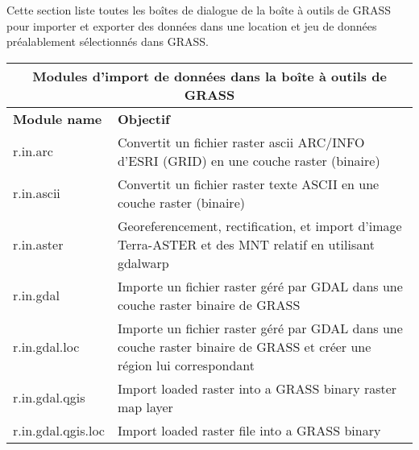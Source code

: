 Cette section liste toutes les boîtes de dialogue de la boîte à outils de GRASS pour importer et exporter des données dans une location et jeu de données préalablement sélectionnés dans GRASS.
\begin{center}
 \begin{tabular}{|p{2.5cm}|p{11.5cm}|}
  \hline \multicolumn{2}{|c|}{\textbf{Modules d'import de données dans la boîte à outils de GRASS}} \\ 
  \hline \textbf{Module name} & \textbf{Objectif} \\
    \hline r.in.arc & Convertit un fichier raster ascii ARC/INFO d'ESRI (GRID) en une couche raster (binaire) \\
 \hline r.in.ascii & Convertit un fichier raster texte ASCII en une couche raster (binaire)\\
  \hline r.in.aster & Georeferencement, rectification, et import d'image Terra-ASTER et des MNT relatif en utilisant gdalwarp \\
    \hline r.in.gdal &  Importe un fichier raster géré par GDAL dans une couche raster binaire de GRASS\\
  \hline r.in.gdal.loc &  Importe un fichier raster géré par GDAL dans une couche raster binaire de GRASS et créer une région lui correspondant\\
  \hline r.in.gdal.qgis & Import loaded raster into a GRASS binary raster map
  layer \\
  \hline r.in.gdal.qgis.loc &  Import loaded raster file into a GRASS binary

\end{tabular}
\end{center}
